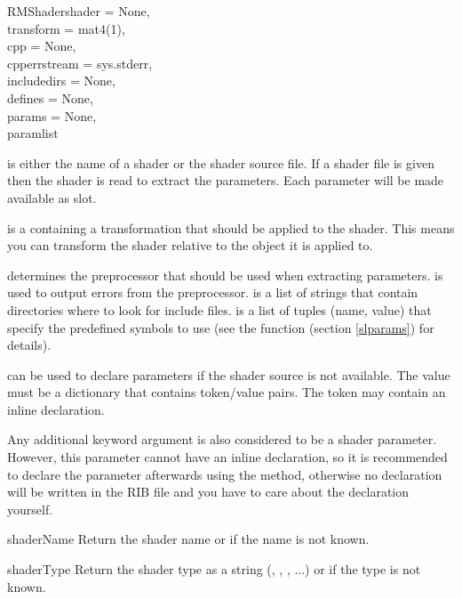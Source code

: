 \begin{classdesc}{RMShader}{shader = None, \\
                            transform = mat4(1), \\
                            cpp = None, \\
                            cpperrstream = sys.stderr, \\
                            includedirs = None,\\
                            defines = None,\\
                            params = None, \\
                            paramlist}
	
 is either the name of a shader or the shader source file.
If a shader file is given then the shader is read to extract the parameters.
Each parameter will be made available as slot.

 is a  containing a transformation that should
be applied to the shader. This means you can transform the shader relative
to the object it is applied to.

 determines the preprocessor that should be used when extracting
parameters.  is used to output errors from the
preprocessor.  is a list of strings that contain
directories where to look for include files.  is a list of
tuples (name, value) that specify the predefined symbols to use (see
the function  (section
\ref{slparams}) for details).

 can be used to declare parameters if the shader source
is not available. The value must be a dictionary that contains
token/value pairs. The token may contain an inline declaration. 

Any additional keyword argument is also considered to be a shader
parameter. However, this parameter cannot have an inline declaration,
so it is recommended to declare the parameter afterwards using the
 method, otherwise no declaration will be 
written in the RIB file and you have to care about the declaration
yourself.
\end{classdesc}

\begin{methoddesc}{shaderName}{}
Return the shader name or  if the name is not known.
\end{methoddesc}

\begin{methoddesc}{shaderType}{}
Return the shader type as a string (, ,
, ...) or  if the type is not known.
\end{methoddesc}

